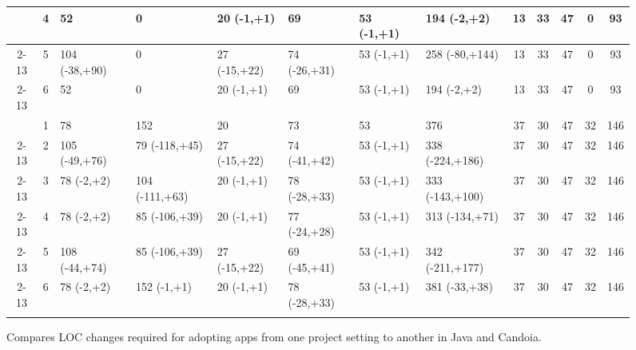 \begin{figure}
\begin{adjustbox}{max width=\textwidth}
\begin{tabular}{|c|c|l|l|l|l|l|l|c|c|c|c|c|}
\begin{comment}
\cline{2-13} & 4 & 52 & 0 & 20 (-1,+1) & 69 & 53 (-1,+1) & 194 (-2,+2) & 13 & 33 & 47 & 0 & 93 \\

\cline{2-13} & 5 & 104 (-38,+90) & 0 & 27 (-15,+22) & 74 (-26,+31) & 53 (-1,+1)
& 258 (-80,+144) & 13 & 33 & 47 & 0 & 93 \\

\cline{2-13} & 6 & 52 & 0 & 20 (-1,+1) & 69 & 53 (-1,+1) & 194 (-2,+2)
& 13 & 33 & 47 & 0 & 93 \\ \hline
\end{comment}


\begin{comment}
\multirow{6}{*}{\begin{sideways}BugSrc Mapper\end{sideways}}
& 1 & 78 & 152 & 20 & 73 & 53 & 376 & 37 & 30 & 47 & 32 & 146 \\ 

\cline{2-13} & 2 & 105 (-49,+76) & 79 (-118,+45) & 27 (-15,+22) & 74 (-41,+42) &
53 (-1,+1) & 338 (-224,+186) & 37 & 30 & 47 & 32 & 146 \\

\cline{2-13} & 3 & 78 (-2,+2) & 104 (-111,+63) & 20 (-1,+1) & 78 (-28,+33) & 53
(-1,+1) & 333 (-143,+100) & 37 & 30 & 47 & 32 & 146 \\

\cline{2-13} & 4 & 78 (-2,+2) & 85 (-106,+39) & 20 (-1,+1) & 77 (-24,+28) & 53
(-1,+1) & 313 (-134,+71) & 37 & 30 & 47 & 32 & 146 \\

\cline{2-13} & 5 & 108 (-44,+74) & 85 (-106,+39) & 27 (-15,+22) & 69 (-45,+41) &
53 (-1,+1) & 342 (-211,+177) & 37 & 30 & 47 & 32 & 146 \\

\cline{2-13} & 6 & 78 (-2,+2) & 152 (-1,+1) & 20 (-1,+1) & 78 (-28,+33) & 53
(-1,+1) & 381 (-33,+38) & 37 & 30 & 47 & 32 & 146 \\
\hline

\end{comment}
\end{tabular}
\end{adjustbox}
\caption{\tiny{Compares LOC changes required for adopting apps from one project
setting to another in Java and Candoia.}}
\label{fig:adoptability}
\end{figure}